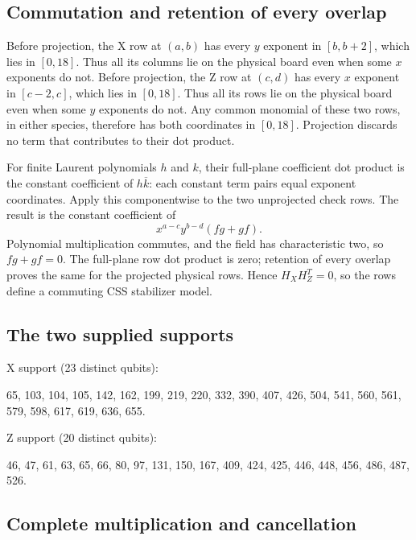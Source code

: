 \documentclass{article}
\begin{document}
\subsection{Commutation and retention of every overlap}\label{app:witness-commutation}

Before projection, the X row at \((a,b)\) has every \(y\) exponent in \([b, b+2]\),
which lies in \([0,18]\). Thus all its columns lie on the physical board even
when some \(x\) exponents do not. Before projection, the Z row at \((c,d)\) has
every \(x\) exponent in \([c-2, c]\), which lies in \([0,18]\). Thus all its rows lie
on the physical board even when some \(y\) exponents do not. Any common
monomial of these two rows, in either species, therefore has both coordinates
in \([0,18]\). Projection discards no term that contributes to their dot product.

For finite Laurent polynomials \(h\) and \(k\), their full-plane coefficient dot
product is the constant coefficient of \(h \overline{k}\): each constant term pairs
equal exponent coordinates. Apply this componentwise to the two unprojected
check rows. The result is the constant coefficient of
\begin{equation}
  x^{a-c} y^{b-d} (fg + gf).
\end{equation}
Polynomial multiplication commutes, and the field has characteristic two,
so \(fg + gf = 0\). The full-plane row dot product is zero; retention of every
overlap proves the same for the projected physical rows. Hence
\(H_X H_Z^T = 0\), so the rows define a commuting CSS stabilizer model.

\subsection{The two supplied supports}\label{app:witness-supports}

X support (23 distinct qubits):

65, 103, 104, 105, 142, 162, 199, 219, 220, 332, 390, 407, 426, 504, 541, 560, 561, 579, 598,
617, 619, 636, 655.

Z support (20 distinct qubits):

46, 47, 61, 63, 65, 66, 80, 97, 131, 150, 167, 409, 424, 425, 446, 448, 456, 486, 487, 526.

\subsection{Complete multiplication and cancellation}\label{app:witness-multiplication}
\end{document}
